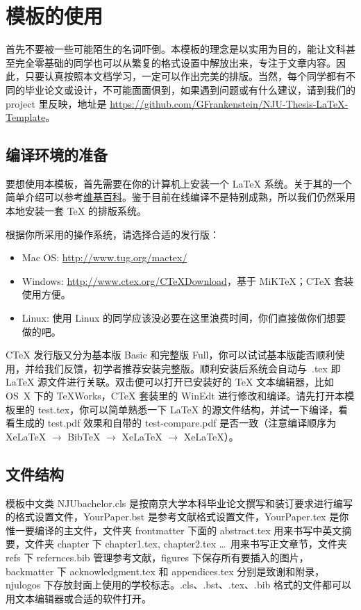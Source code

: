 \chapter{模板的使用}
首先不要被一些可能陌生的名词吓倒。本模板的理念是以实用为目的，能让文科甚至完全零基础的同学也可以从繁复的格式设置中解放出来，专注于文章内容。因此，只要认真按照本文档学习，一定可以作出完美的排版。当然，每个同学都有不同的毕业论文或设计，不可能面面俱到，如果遇到问题或有什么建议，请到我们的 project 里反映，地址是 \url{https://github.com/GFrankenstein/NJU-Thesis-LaTeX-Template}。

\section{编译环境的准备}
要想使用本模板，首先需要在你的计算机上安装一个 LaTeX 系统。关于其的一个简单介绍可以参考\href{http://zh.wikipedia.org/wiki/Latex}{维基百科}。鉴于目前在线编译不是特别成熟，所以我们仍然采用本地安装一套 \TeX{} 的排版系统。

根据你所采用的操作系统，请选择合适的发行版：
\begin{itemize}\label{text:eg}
	\item Mac OS: \url{http://www.tug.org/mactex/}
	\item Windows: \url{http://www.ctex.org/CTeXDownload}，基于 MiKTeX；CTeX 套装使用方便。
	\item Linux: 使用 Linux 的同学应该没必要在这里浪费时间，你们直接做你们想要做的吧。
\end{itemize}
CTeX 发行版又分为基本版 Basic 和完整版 Full，你可以试试基本版能否顺利使用，并给我们反馈，初学者推荐安装完整版。顺利安装后系统会自动与\ .tex 即 LaTeX 源文件进行关联。双击便可以打开已安装好的 \TeX{} 文本编辑器，比如 \mbox{OS X} 下的 TeXWorks，CTeX 套装里的 WinEdt 进行修改和编译。请先打开本模板里的 test.tex，你可以简单熟悉一下 LaTeX 的源文件结构，并试一下编译，看看生成的 test.pdf 效果和自带的 test-compare.pdf 是否一致（注意编译顺序为 XeLaTeX $\rightarrow$ BibTeX $\rightarrow$ XeLaTeX $\rightarrow$ XeLaTeX）。

\section{文件结构}
模板中文类 NJUbachelor.cls 是按南京大学本科毕业论文撰写和装订要求进行编写的格式设置文件，YourPaper.bst 是参考文献格式设置文件，YourPaper.tex 是你惟一要编译的主文件，文件夹 frontmatter 下面的 abstract.tex 用来书写中英文摘要，文件夹 chapter 下 chapter1.tex, chapter2.tex \ldots~用来书写正文章节，文件夹 refs 下 refernces.bib 管理参考文献，figures 下保存所有要插入的图片，backmatter 下 acknowledgment.tex 和 appendices.tex 分别是致谢和附录，njulogos 下存放封面上使用的学校标志。.cls、.bst、.tex、.bib 格式的文件都可以用文本编辑器或合适的软件打开。


